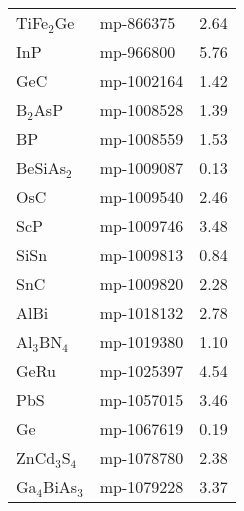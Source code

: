 \begin{center}
\begin{longtable}{M{3.5cm} M{6.5cm} M{2.0cm}}
  TiFe$_2$Ge & mp-866375 & 2.64\\
  InP & mp-966800 & 5.76\\
  GeC & mp-1002164 & 1.42\\
  B$_2$AsP & mp-1008528 & 1.39\\
  BP & mp-1008559 & 1.53\\
  BeSiAs$_2$ & mp-1009087 & 0.13\\
  OsC & mp-1009540 & 2.46\\
  ScP & mp-1009746 & 3.48\\
  SiSn & mp-1009813 & 0.84\\
  SnC & mp-1009820 & 2.28\\
  AlBi & mp-1018132 & 2.78\\
  Al$_3$BN$_4$ & mp-1019380 & 1.10\\
  GeRu & mp-1025397 & 4.54\\
  PbS & mp-1057015 & 3.46\\
  Ge & mp-1067619 & 0.19\\
  ZnCd$_3$S$_4$ & mp-1078780 & 2.38\\
  Ga$_4$BiAs$_3$ & mp-1079228 & 3.37\\
  \hline
\end{longtable}
\end{center}
